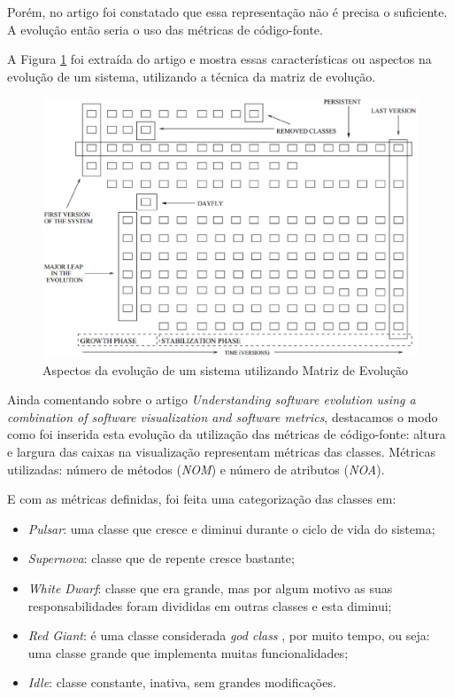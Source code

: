 Porém, no artigo foi constatado que essa representação não é precisa o suficiente.
A evolução então seria o uso das métricas de código-fonte.

A Figura \ref{fig:evolutionMatrixAspects} \cite{Lanza02understandingsoftware}
foi extraída do artigo e mostra essas características ou aspectos na evolução de
um sistema, utilizando a técnica da matriz de evolução.

\begin{figure}[!htb]
  \centering
    \includegraphics[keepaspectratio=true,scale=0.5]
    {figuras/evolutionMatrixAspects.eps}
  \caption{Aspectos da evolução de um sistema utilizando Matriz de Evolução}
  \label{fig:evolutionMatrixAspects}
\end{figure}


Ainda comentando sobre o artigo \textit{Understanding software evolution using
a combination of software visualization and software metrics}, destacamos
o modo como foi inserida esta evolução da utilização das métricas de código-fonte:
altura e largura das caixas na visualização representam métricas das
classes. Métricas utilizadas: número de métodos (\textit{NOM}) e número de
atributos (\textit{NOA}).

E com as métricas definidas, foi feita uma categorização das classes em:

\begin{itemize}
  \item \textit{Pulsar}: uma classe que cresce e diminui durante o ciclo de
  vida do sistema;
  \item \textit{Supernova}: classe que de repente cresce bastante;
  \item \textit{White Dwarf}: classe que era grande, mas por algum motivo as
  suas responsabilidades foram divididas em outras classes e esta diminui;
  \item \textit{Red Giant}: é uma classe considerada \textit{god class}
  \cite{riel1996object}, por muito tempo, ou seja: uma classe grande que
  implementa muitas funcionalidades;
  \item \textit{Idle}: classe constante, inativa, sem grandes modificações.
\end{itemize}

